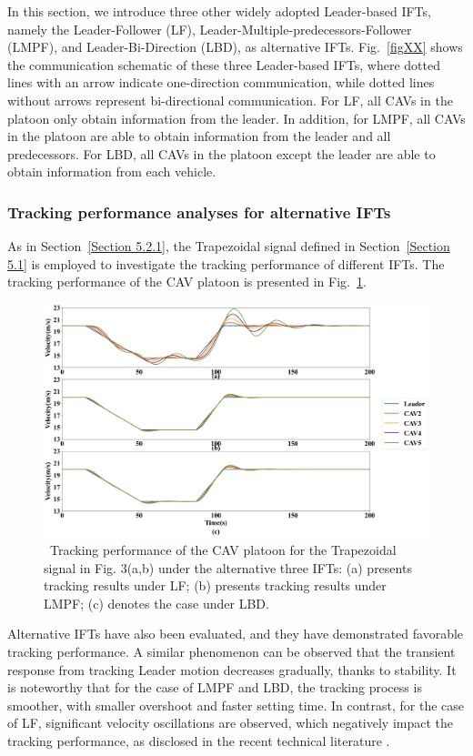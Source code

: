 \documentclass[a4paper]{cas-sc}
\begin{document}
In this section, we introduce three other widely adopted Leader-based IFTs, namely the Leader-Follower (LF), Leader-Multiple-predecessors-Follower (LMPF), and Leader-Bi-Direction (LBD), as alternative IFTs. Fig.~\ref{figXX} shows the communication schematic of these three Leader-based IFTs, where dotted lines with an arrow indicate one-direction communication, while dotted lines without arrows represent bi-directional communication. For LF, all CAVs in the platoon only obtain information from the leader. In addition, for LMPF, all CAVs in the platoon are able to obtain information from the leader and all predecessors. For LBD, all CAVs in the platoon except the leader are able to obtain information from each vehicle. 

\subsubsection{Tracking performance analyses for alternative IFTs}

As in Section~\ref{Section 5.2.1}, the Trapezoidal signal defined in Section~\ref{Section 5.1} is employed to investigate the tracking performance of different IFTs. The tracking performance of the CAV platoon is presented in Fig.~\ref{fig9}.

\begin{figure}

  \centering
  \includegraphics[width=12cm]{figs/fig9.png}
  \caption{~Tracking performance of the CAV platoon for the Trapezoidal signal in Fig. 3(a,b) under the alternative three IFTs: (a) presents tracking results under LF; (b) presents tracking results under LMPF; (c) denotes the case under LBD.}
  \label{fig9}
\end{figure}

Alternative IFTs have also been evaluated, and they have demonstrated favorable tracking performance. A similar phenomenon can be observed that the transient response from tracking Leader motion decreases gradually, thanks to stability. It is noteworthy that for the case of LMPF and LBD, the tracking process is smoother, with smaller overshoot and faster setting time. In contrast, for the case of LF, significant velocity oscillations are observed, which negatively impact the tracking performance, as disclosed in the recent technical literature \citep{Zheng2015}.
\end{document}
